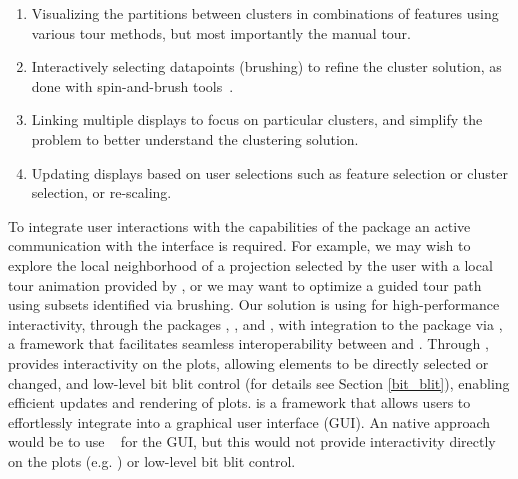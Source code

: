 \documentclass[article]{ajs}
\begin{document}
\begin{enumerate}
\item Visualizing the partitions between clusters in combinations of features using various tour methods, but most importantly the manual tour.
\item Interactively selecting datapoints (brushing) to refine the cluster solution, as done with spin-and-brush tools~\citep{ggobi}.
\item Linking multiple displays to focus on particular clusters, and simplify the problem to better understand the clustering solution. 
\item Updating displays based on user selections such as feature selection or cluster selection, or re-scaling.
\end{enumerate}

To integrate user interactions with the capabilities of the  package an active communication with the interface is required. For example, we may wish to explore the local neighborhood of a projection selected by the user with a local tour animation provided by , or we may want to optimize a guided tour path using subsets identified via brushing.
Our solution is using  for high-performance interactivity, through the packages  \citep{lundh1999introduction},  \citep{schimansky24}, and  \citep{Hunter:2007}, with integration to the  package \citep{tourr} via  \citep{reticulate}, a framework that facilitates seamless interoperability between  and . Through ,  provides interactivity on the plots, allowing elements to be directly selected or changed, and low-level bit blit control (for details see Section \ref{bit_blit}), enabling efficient updates and rendering of plots.  is a framework that allows users to effortlessly integrate  into a graphical user interface (GUI). An  native approach would be to use ~\citep{shiny} for the GUI, but this would not provide interactivity directly on the plots (e.g. \citep{laa2023new}) or low-level bit blit control.

\end{document}
